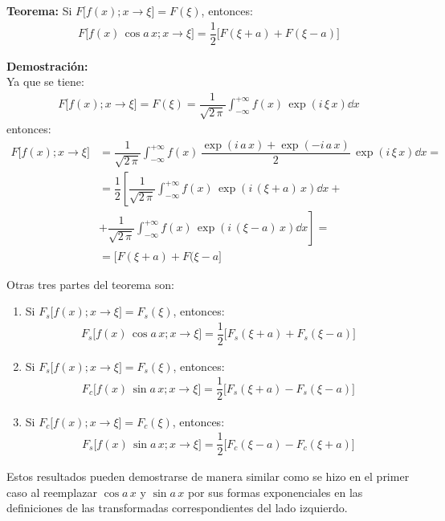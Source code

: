 \textbf{Teorema:} Si $F \big[f(x); x \to \xi \big] = F(\xi)$, entonces:
\begin{align*}
F \big[f(x) \, \cos a \, x; x \to \xi \big] = \dfrac{1}{2} \big[F(\xi + a) + F(\xi - a) \big]
\end{align*}

\textbf{Demostración:}
\\
Ya que se tiene:
\begin{align*}
F \big[f(x); x \to \xi \big] = F(\xi) = \dfrac{1}{\sqrt{2 \, \pi}} \int_{-\infty}^{+\infty} f(x) \, \exp(i \, \xi \, x) \dd{x}
\end{align*}
entonces:
\begin{align*}
F \big[f(x); x \to \xi \big] &= \dfrac{1}{\sqrt{2 \, \pi}} \int_{-\infty}^{+\infty} f(x) \, \dfrac{\exp(i \, a \, x) + \exp(-i \, a \, x)}{2} \, \exp(i \, \xi \, x) \dd{x} = \\[0.5em]
&= \dfrac{1}{2} \left[ \dfrac{1}{\sqrt{2 \, \pi}} \int_{-\infty}^{+\infty} f(x) \, \exp(i \, (\xi + a) \, x)  \dd{x} + \right. \\[0.5em]
&+ \left. \dfrac{1}{\sqrt{2 \, \pi}} \int_{-\infty}^{+\infty} f(x) \, \exp(i \, (\xi - a) \, x)  \dd{x} \right] = \\[0.5em]
&= \big[ F(\xi + a) + F (\xi - a \big]
\end{align*}

Otras tres partes del teorema son:
\begin{enumerate}[label=\alph*)]
\item Si $F_{s} \big[f(x); x \to \xi \big] = F_{s} (\xi)$, entonces:
\begin{align*}
F_{s} \big[f(x) \, \cos a \, x; x \to \xi \big] = \dfrac{1}{2} \big[F_{s} (\xi +  a) + F_{s} (\xi - a) \big]
\end{align*}
\item Si $F_{s} \big[f(x); x \to \xi \big] = F_{s} (\xi)$, entonces:
\begin{align*}
F_{c} \big[f(x) \, \sin a \, x; x \to \xi \big] = \dfrac{1}{2} \big[F_{s} (\xi +  a) - F_{s} (\xi - a) \big]
\end{align*}
\item Si $F_{c} \big[f(x); x \to \xi \big] = F_{c} (\xi)$, entonces:
\begin{align*}
F_{s} \big[f(x) \, \sin a \, x; x \to \xi \big] = \dfrac{1}{2} \big[F_{c} (\xi -  a) - F_{c} (\xi + a) \big]
\end{align*}
\end{enumerate}

Estos resultados pueden demostrarse de manera similar como se hizo en el primer caso al reemplazar $\cos a \, x$ y $\sin a \, x$ por sus formas exponenciales en las definiciones de las transformadas correspondientes del lado izquierdo.


